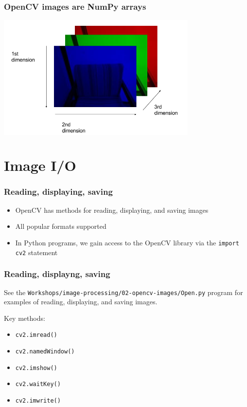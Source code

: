 \documentclass{beamer}
\begin{document}
\begin{frame}
	\frametitle{OpenCV images are NumPy arrays}

	\begin{center}
		\includegraphics[width=0.75\textwidth]{../../fig/02-chair-layers.png}

	\end{center}

\end{frame}

\section{Image I/O}

\begin{frame}
	\frametitle{Reading, displaying, saving}

	\begin{itemize}
		\item OpenCV has methods for reading, displaying, and saving images

		\item All popular formats supported

		\item In Python programs, we gain access to the OpenCV library via the \lstinline!import cv2! statement

	\end{itemize}

\end{frame}

\begin{frame}
	\frametitle{Reading, displayng, saving}

	See the {\tt Workshops/image-processing/02-opencv-images/Open.py} program for examples of reading, displaying, and saving images.

	Key methods:

	\begin{itemize}

		\item \lstinline!cv2.imread()!

		\item \lstinline!cv2.namedWindow()!

		\item \lstinline!cv2.imshow()!

		\item \lstinline!cv2.waitKey()!

		\item \lstinline!cv2.imwrite()!

	\end{itemize}
\end{frame}
\end{document}
